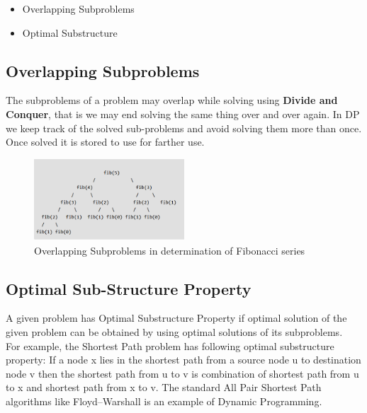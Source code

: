 \documentclass[12pt]{article}
\begin{document}
\begin{itemize}
	\item Overlapping Subproblems
	\item Optimal Substructure
\end{itemize}

\subsection{Overlapping Subproblems}
The subproblems of a problem may overlap while solving using \textbf{Divide and Conquer}, that is we may end solving the same thing over and over again. In DP we keep track of the solved sub-problems and avoid solving them more than once. Once solved it is stored to use for farther use.
\begin{figure}[H]
	\centering
	\captionsetup{justification=centering}
	\includegraphics[width = 0.5\textwidth]{image/overlap.png}
	\caption{
		Overlapping Subproblems in determination of Fibonacci series
	}
	\label{fig:fib}
	
\end{figure}

\subsection{Optimal Sub-Structure Property}
A given problem has Optimal Substructure Property if optimal solution of the given problem can be obtained by using optimal solutions of its subproblems.\\ For example, the Shortest Path problem has following optimal substructure property:
If a node x lies in the shortest path from a source node u to destination node v then the shortest path from u to v is combination of shortest path from u to x and shortest path from x to v. The standard All Pair Shortest Path algorithms like Floyd–Warshall is an example of Dynamic Programming. 

\end{document}
